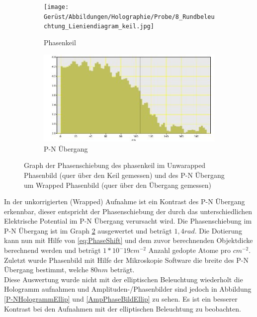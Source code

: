 \begin{figure}[H]
     \centering
     \begin{subfigure}[b]{0.49\textwidth}
         \centering
         \texttt{[image: Gerüst/Abbildungen/Holographie/Probe/8\_Rundbeleuchtung\_Lieniendiagram\_keil.jpg]}
         \caption{Phasenkeil}
         \label{P-NKeil}
     \end{subfigure}
     \hfill
     \begin{subfigure}[b]{0.49\textwidth}
         \centering
         \includegraphics[width=\textwidth]{Gerüst/Abbildungen/Holographie/Probe/8_Rundbeleuchtung_Lieniendiagram_PN_übergang.jpg}
         \caption{P-N Übergang}
         \label{P-NPhase}
     \end{subfigure}
        \caption{Graph der Phasenschiebung des phasenkeil im Unwarapped Phasenbild (quer über den Keil gemessen) und des P-N Übergang um Wrapped Phasenbild (quer über den Übergang gemessen)}
        \label{P-NDiagram}
\end{figure}

In der unkorrigierten (Wrapped) Aufnahme ist ein Kontrast des P-N Übergang erkennbar, dieser entspricht der Phasenschiebung der durch das unterschiedlichen Elektrische Potential im P-N Übergang verursacht wird. Die Phasenschiebung im P-N Übergang ist im Graph \cref{P-NPhase} ausgewertet und beträgt \(1,4 rad\). Die Dotierung kann nun mit Hilfe von \cref{eq:PhaseShift} und dem zuvor berechnenden Objektdicke berechnend werden und beträgt \(1*10^-19 cm^{-2}\) Anzahl gedopte Atome pro \(cm^{-2}\).\\
Zuletzt wurde Phasenbild mit Hilfe der Mikroskopie Software die breite des P-N Übergang bestimmt, welche \(80 nm\) beträgt.\\
Diese Auswertung wurde nicht mit der elliptischen Beleuchtung wiederholt die Hologramm aufnahmen und Amplituden-/Phasenbilder sind jedoch in Abbildung \cref{P-NHologrammEllip} und \cref{AmpPhaseBildEllip} zu sehen. Es ist ein besserer Kontrast bei den Aufnahmen mit der elliptischen Beleuchtung zu beobachten.

